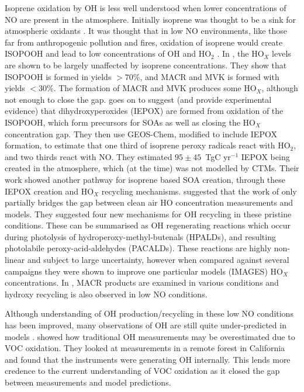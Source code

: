     
    Isoprene oxidation by OH is less well understood when lower concentrations of NO are present in the atmosphere.
    Initially isoprene was thought to be a sink for atmospheric oxidants \citep[e.g.][]{Guenther2000}.
    It was thought that in low NO environments, like those far from anthropogenic pollution and fires, oxidation of isoprene would create ISOPOOH and lead to low concentrations of OH and HO$_2$ \citet{Paulot2009b}.
    In \citet{Paulot2009b}, the HO$_X$ levels are shown to be largely unaffected by isoprene concentrations.
    They show that ISOPOOH is formed in yields $> 70\%$, and MACR and MVK is formed with yields $< 30\%$.
    The formation of MACR and MVK produces some HO$_X$, although not enough to close the gap.
    \citet{Paulot2009b} goes on to suggest (and provide experimental evidence) that dihydroxyperoxides (IEPOX) are formed from oxidation of the ISOPOOH, which form precursors for SOAs as well as closing the HO$_X$ concentration gap.
    They then use GEOS-Chem, modified to include IEPOX formation, to estimate that one third of isoprene peroxy radicals react with HO$_2$, and two thirds react with NO. 
    They estimated $95 \pm 45$~TgC yr$^{-1}$ IEPOX being created in the atmosphere, which (at the time) was not modelled by CTMs.
    Their work showed another pathway for isoprene based SOA creation, through these IEPOX creation and HO$_X$ recycling mechanisms.
    \citet{Peeters2010} suggested that the work of \citet{Paulot2009b} only partially bridges the gap between clean air HO concentration measurements and models.
    They suggested four new mechanisms for OH recycling in these pristine conditions.
    These can be summarised as OH regenerating reactions which occur during photolysis of hydroperoxy-methyl-butenals (HPALDs), and resulting photolabile peroxy-acid-aldehydes (PACALDs).
    These reactions are highly non-linear and subject to large uncertainty, however when compared against several campaigns they were shown to improve one particular models (IMAGES) HO$_X$ concentrations.
    In \cite{Crounse2012}, MACR products are examined in various conditions and hydroxy recycling is also observed in low NO conditions.
    
    Although understanding of OH production/recycling in these low NO conditions has been improved, many observations of OH are still quite under-predicted in models \citep{Mao2012}.
    \cite{Mao2012} showed how traditional OH measurements may be overestimated due to VOC oxidation.
    They looked at measurements in a remote forest in California and found that the instruments were generating OH internally.
    This lends more credence to the current understanding of VOC oxidation as it closed the gap between measurements and model predictions.
      
